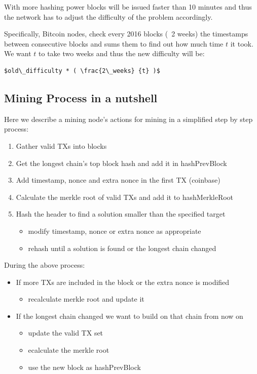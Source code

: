 With more hashing power blocks will be issued faster than 10 minutes and thus the network has to adjust the difficulty of the problem accordingly.

Specifically, Bitcoin nodes, check every 2016 blocks (~2 weeks) the timestamps between consecutive blocks and sums them to find out how much time $t$ it took. We want $t$ to take two weeks and thus the new difficulty will be:

\begin{emphbox}
\begin{lstlisting}[style=Pseudomath]
$old\_difficulty * ( \frac{2\_weeks} {t} )$
\end{lstlisting}
\end{emphbox}

\subsection*{Mining Process in a nutshell}
Here we describe a mining node's actions for mining in a simplified step by step process:

\begin{enumerate}
\item Gather valid TXs into blocks
\item Get the longest chain’s top block hash and add it in hashPrevBlock
\item Add timestamp, nonce and extra nonce in the first TX (coinbase)
\item Calculate the merkle root of valid TXs and add it to hashMerkleRoot
\item Hash the header to find a solution smaller than the specified target
  \begin{itemize}
  \item modify timestamp, nonce or extra nonce as appropriate
  \item rehash until a solution is found or the longest chain changed
  \end{itemize}
\end{enumerate}

During the above process:
\begin{itemize}
\item If more TXs are included in the block or the extra nonce is modified
  \begin{itemize}
  \item recalculate merkle root and update it
  \end{itemize}
\item If the longest chain changed we want to build on that chain from now on
  \begin{itemize}
  \item update the valid TX set
  \item ecalculate the merkle root
  \item use the new block as hashPrevBlock
  \end{itemize}
\end{itemize}



